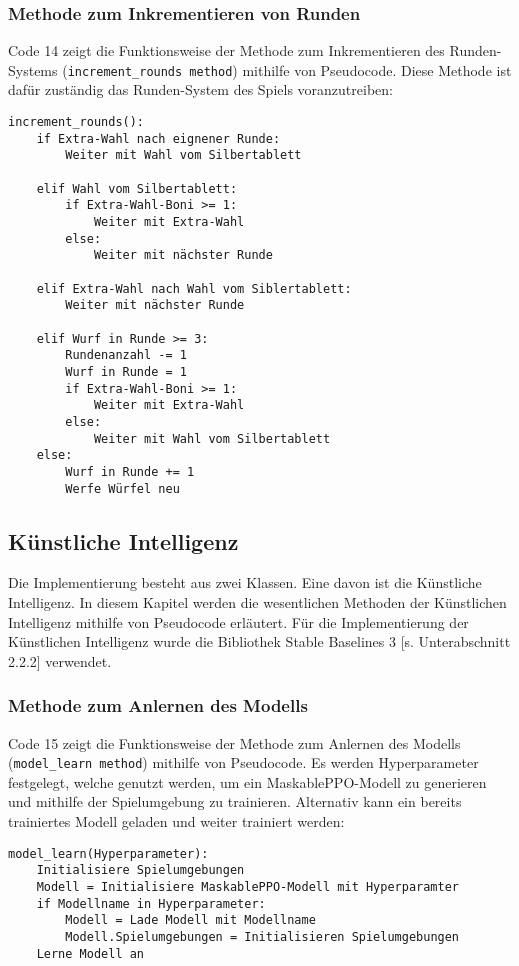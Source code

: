 \subsubsection{Methode zum Inkrementieren von Runden}
\begin{minipage}{\linewidth}
Code 14 zeigt die Funktionsweise der Methode zum Inkrementieren des Runden-Systems (\texttt{increment\_rounds method}) mithilfe von Pseudocode. Diese Methode ist dafür zuständig das Runden-System des Spiels voranzutreiben:
\vspace{0.5cm}
\begin{lstlisting}[caption={Methode zum Inkrementieren des Runden-Systems}]
increment_rounds():
	if Extra-Wahl nach eignener Runde:
		Weiter mit Wahl vom Silbertablett
		
	elif Wahl vom Silbertablett:
		if Extra-Wahl-Boni >= 1:
			Weiter mit Extra-Wahl
		else:
			Weiter mit nächster Runde
	
	elif Extra-Wahl nach Wahl vom Siblertablett:
		Weiter mit nächster Runde
	
	elif Wurf in Runde >= 3:
		Rundenanzahl -= 1
		Wurf in Runde = 1
		if Extra-Wahl-Boni >= 1:
			Weiter mit Extra-Wahl
		else:
			Weiter mit Wahl vom Silbertablett
	else:
		Wurf in Runde += 1
		Werfe Würfel neu
\end{lstlisting}
\end{minipage}
\subsection{Künstliche Intelligenz}
Die Implementierung besteht aus zwei Klassen. Eine davon ist die Künstliche Intelligenz. In diesem Kapitel werden die wesentlichen Methoden der Künstlichen Intelligenz mithilfe von Pseudocode erläutert. Für die Implementierung der Künstlichen Intelligenz wurde die Bibliothek Stable Baselines 3 [s. Unterabschnitt 2.2.2] verwendet.
\subsubsection{Methode zum Anlernen des Modells}
\begin{minipage}{\linewidth}
Code 15 zeigt die Funktionsweise der Methode zum Anlernen des Modells (\texttt{model\_learn method}) mithilfe von Pseudocode. Es werden Hyperparameter festgelegt, welche genutzt werden, um ein MaskablePPO-Modell zu generieren und mithilfe der Spielumgebung zu trainieren. Alternativ kann ein bereits trainiertes Modell geladen und weiter trainiert werden:
\vspace{0.5cm}
\begin{lstlisting}[caption={Methode zu Anlernen des Modells},morekeywords={Hyperparameter}]
model_learn(Hyperparameter):
	Initialisiere Spielumgebungen
	Modell = Initialisiere MaskablePPO-Modell mit Hyperparamter
	if Modellname in Hyperparameter:
		Modell = Lade Modell mit Modellname
		Modell.Spielumgebungen = Initialisieren Spielumgebungen
	Lerne Modell an
\end{lstlisting}
\end{minipage}
